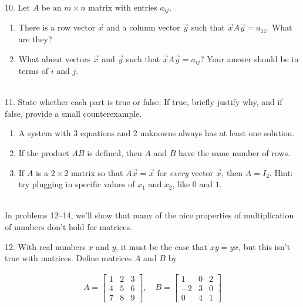 \documentclass{article}
\begin{document}
10. Let $A$ be an $m \times n$ matrix with entries $a_{ij}$.

\begin{enumerate}

	\item There is a row vector $\vec{x}$ and a column vector $\vec{y}$ such that $\vec{x}A\vec{y} = a_{11}$. What are they?

	\item What about vectors $\vec{x}$ and $\vec{y}$ such that $\vec{x}A\vec{y} = a_{ij}$? Your answer should be in terms of $i$ and $j$.

\end{enumerate}

~\\

11. State whether each part is true or false. If true, briefly justify why, and if false, provide a small counterexample.

\begin{enumerate}

	\item A system with $3$ equations and $2$ unknowns always has at least one solution.

	\item If the product $AB$ is defined, then $A$ and $B$ have the same number of rows.

	\item If $A$ is a $2 \times 2$ matrix so that $A\vec{x} = \vec{x}$ for \textit{every} vector $\vec{x}$, then $A = I_2$. Hint: try plugging in specific values of $x_1$ and $x_2$, like $0$ and $1$.

\end{enumerate}

~\\

In problems 12--14, we'll show that many of the nice properties of multiplication of numbers don't hold for matrices.

12. With real numbers $x$ and $y$, it must be the case that $xy = yx$, but this isn't true with matrices. Define matrices $A$ and $B$ by

\begin{align*}
	A = \left[\begin{array}{ccc}1& 2& 3 \\ 4& 5& 6 \\ 7& 8& 9\end{array}\right], \quad B = \left[\begin{array}{ccc}1& 0& 2 \\ -2& 3& 0 \\ 0& 4& 1\end{array}\right]
\end{align*}
\end{document}
